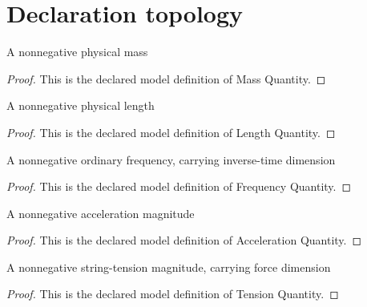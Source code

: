 \section{Declaration topology}
\begin{definition}
  \label{def:physics:phyx-mini-0298:phyxminiproblems-problemphyxmini0298-massquantity}
  A nonnegative physical mass
\end{definition}
\begin{proof}
  This is the declared model definition of Mass Quantity.
\end{proof}
\begin{definition}
  \label{def:physics:phyx-mini-0298:phyxminiproblems-problemphyxmini0298-lengthquantity}
  A nonnegative physical length
\end{definition}
\begin{proof}
  This is the declared model definition of Length Quantity.
\end{proof}
\begin{definition}
  \label{def:physics:phyx-mini-0298:phyxminiproblems-problemphyxmini0298-frequencyquantity}
  A nonnegative ordinary frequency, carrying inverse-time dimension
\end{definition}
\begin{proof}
  This is the declared model definition of Frequency Quantity.
\end{proof}
\begin{definition}
  \label{def:physics:phyx-mini-0298:phyxminiproblems-problemphyxmini0298-accelerationquantity}
  A nonnegative acceleration magnitude
\end{definition}
\begin{proof}
  This is the declared model definition of Acceleration Quantity.
\end{proof}
\begin{definition}
  \label{def:physics:phyx-mini-0298:phyxminiproblems-problemphyxmini0298-tensionquantity}
  A nonnegative string-tension magnitude, carrying force dimension
\end{definition}
\begin{proof}
  This is the declared model definition of Tension Quantity.
\end{proof}
